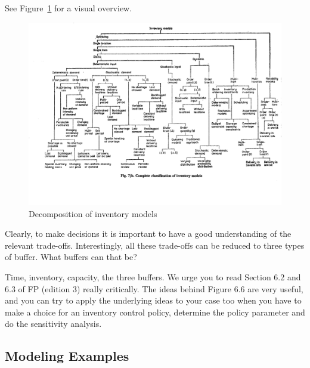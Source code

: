 \begin{question}
See Figure~\ref{fig:costs} for a visual overview.

\begin{figure}
\centering
\includegraphics[width=\textwidth]{figures/chikan.png}
\caption{Decomposition of inventory models}
\label{fig:costs}
\end{figure}


\end{question}



\begin{question}
  Clearly, to make decisions it is important to have a good understanding
  of the relevant trade-offs. Interestingly, all these trade-offs can
  be reduced to three types of buffer. What buffers can that be?
  \begin{solution}
    Time, inventory, capacity, the three buffers. We urge you to read
    Section 6.2 and 6.3 of FP (edition 3) really critically. The ideas
    behind Figure 6.6 are very useful, and you can try to apply the
    underlying ideas to your case too when you have to make a choice
    for an inventory control policy, determine the policy parameter
    and do the sensitivity analysis.
  \end{solution}
\end{question}



\subsection{Modeling Examples}
\label{sec:examples}

